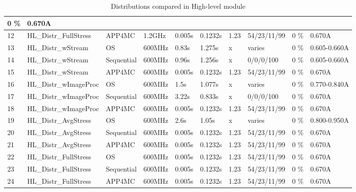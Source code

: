 {\begin{table}[!ht]
{\begin{tabular}{|l|l|l|l|l|l|l|l|l|l|}
				0 \% &
				0.670A \\
				\hline
				12 &
				HL{\_}Distr{\_}FullStress &
				APP4MC &
				1.2GHz &
				0.005s &
				0.1232s &
				1.23 &
				54/23/11/99 &
				0 \% &
				0.670A \\
				\hline
				13 &
				HL{\_}Distr{\_}wStream &
				OS &
				600MHz &
				0.83s &
				1.275s &
				x &
				varies &
				0 \% &
				0.605-0.660A \\
				\hline
				14 &
				HL{\_}Distr{\_}wStream &
				Sequential &
				600MHz &
				0.96s &
				1.256s &
				x &
				0/0/0/100 &
				0 \% &
				0.605-0.660A \\
				\hline
				15 &
				HL{\_}Distr{\_}wStream &
				APP4MC &
				600MHz &
				0.005s &
				0.1232s &
				1.23 &
				54/23/11/99 &
				0 \% &
				0.670A \\
				\hline
				16 &
				HL{\_}Distr{\_}wImageProc &
				OS &
				600MHz &
				1.5s &
				1.077s &
				x &
				varies&
				0 \% &
				0.770-0.840A \\
				\hline
				17 &
				HL{\_}Distr{\_}wImageProc &
				Sequential &
				600MHz &
				3.22s &
				0.833s &
				x &
				0/0/0/100 &
				0 \% &
				0.670A \\
				\hline
				18 &
				HL{\_}Distr{\_}wImageProc &
				APP4MC &
				600MHz &
				0.005s &
				0.1232s &
				1.23 &
				54/23/11/99 &
				0 \% &
				0.670A \\
				\hline
				19 &
				HL{\_}Distr{\_}AvgStress &
				OS &
				600MHz &
				2.6s &
				1.05s &
				x &
				varies  &
				0 \% &
				0.800-0.950A \\
				\hline
				20 &
				HL{\_}Distr{\_}AvgStress &
				Sequential &
				600MHz &
				0.005s &
				0.1232s &
				1.23 &
				54/23/11/99 &
				0 \% &
				0.670A \\
				\hline
				21 &
				HL{\_}Distr{\_}AvgStress &
				APP4MC &
				600MHz &
				0.005s &
				0.1232s &
				1.23 &
				54/23/11/99 &
				0 \% &
				0.670A \\
				\hline
				22 &
				HL{\_}Distr{\_}FullStress &
				OS &
				600MHz &
				0.005s &
				0.1232s &
				1.23 &
				54/23/11/99 &
				0 \% &
				0.670A \\
				\hline
				23 &
				HL{\_}Distr{\_}FullStress &
				Sequential &
				600MHz &
				0.005s &
				0.1232s &
				1.23 &
				54/23/11/99 &
				0 \% &
				0.670A \\
				\hline
				24 &
				HL{\_}Distr{\_}FullStress &
				APP4MC &
				600MHz &
				0.005s &
				0.1232s &
				1.23 &
				54/23/11/99 &
				0 \% &
				0.670A \\
				\hline
			\end{tabular}
			}
			\caption{Distributions compared in High-level module}
			\label{tbl_hlcomparison}
		\end{table}
}


